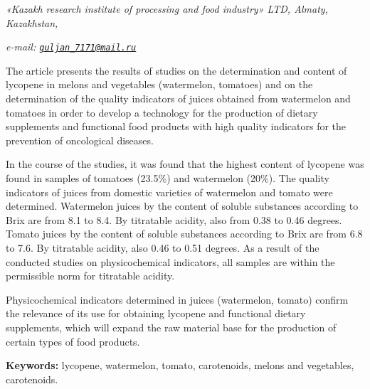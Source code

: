 \begin{affiliation}
\emph{«Kazakh research institute of processing and food industry» LTD, Almaty, Kazakhstan,}

\emph{e-mail: \href{mailto:guljan_7171@mail.ru}{\nolinkurl{guljan\_7171@mail.ru}}}
\end{affiliation}

The article presents the results of studies on the determination and
content of lycopene in melons and vegetables (watermelon, tomatoes) and
on the determination of the quality indicators of juices obtained from
watermelon and tomatoes in order to develop a technology for the
production of dietary supplements and functional food products with high
quality indicators for the prevention of oncological diseases.

In the course of the studies, it was found that the highest content of
lycopene was found in samples of tomatoes (23.5\%) and watermelon
(20\%). The quality indicators of juices from domestic varieties of
watermelon and tomato were determined. Watermelon juices by the content
of soluble substances according to Brix are from 8.1 to 8.4. By
titratable acidity, also from 0.38 to 0.46 degrees. Tomato juices by the
content of soluble substances according to Brix are from 6.8 to 7.6. By
titratable acidity, also 0.46 to 0.51 degrees. As a result of the
conducted studies on physicochemical indicators, all samples are within
the permissible norm for titratable acidity.

Physicochemical indicators determined in juices (watermelon, tomato)
confirm the relevance of its use for obtaining lycopene and functional
dietary supplements, which will expand the raw material base for the
production of certain types of food products.

{\bfseries Keywords:} lycopene, watermelon, tomato, carotenoids, melons and
vegetables, carotenoids.

